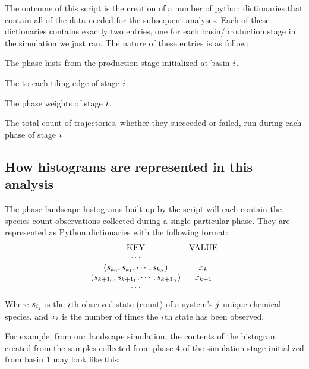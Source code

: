 The outcome of this script is the creation of a number of python dictionaries that contain all of the data needed for the subsequent analyses. Each of these dictionaries contains exactly two entries, one for each basin/production stage in the simulation we just ran. The nature of these entries is as follow:
\begin{description}[style=nextline]
    \item[\code{basinPhaseHists[i]}]
        The phase hists from the production stage initialized at basin $i$.
    \item[\code{basinMFPTs[i]}]
        The  to each tiling edge of stage $i$.
    \item[\code{basinPhaseWeights[i]}]
        The phase weights of stage $i$.
    \item[\code{basinTrajectoryCounts[i]}]
        The total count of trajectories, whether they succeeded or failed, run during each phase of stage $i$
\end{description}

\subsection{How histograms are represented in this analysis}

The phase landscape histograms built up by the script will each contain the species count observations collected during a single particular phase. They are represented as Python dictionaries with the following format:
\begin{equation*}
    \begin{array}{cc}
    \text{KEY} & \text{VALUE}\\
    \cdots &\\
    (s_{k_0}, s_{k_1}, \cdots, s_{k_S}) & x_k \\
    (s_{k+1_0}, s_{k+1_1}, \cdots, s_{k+1_S}) & x_{k+1} \\
    \cdots &\\
    \end{array}
\end{equation*}
Where $s_{i_j}$ is the $i$th observed state (\ie count) of a system's $j$ unique chemical species, and $x_i$ is the number of times the $i$th state has been observed.

For example, from our  landscape simulation, the contents of the histogram created from the samples collected from phase 4 of the simulation stage initialized from basin 1 may look like this:

